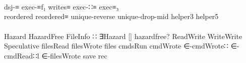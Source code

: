 \begin{code}[hide]
\AgdaSymbol{)}\<%
\\
\>[0]\AgdaSpace{}%
\AgdaSpace{}%
\AgdaSpace{}%
\AgdaSpace{}%
\AgdaSymbol{(}\AgdaSymbol{)}\<%
\\
\>[0]\AgdaSpace{}%
\AgdaSpace{}%
\AgdaSpace{}%
\AgdaSymbol{(}\AgdaSymbol{)}\AgdaSpace{}%
\AgdaSpace{}%
\<%
\\
\>[0]\AgdaSpace{}%
\AgdaSpace{}%
\AgdaSpace{}%
\AgdaSymbol{(}\AgdaSymbol{)}\AgdaSpace{}%
\AgdaSpace{}%
\AgdaSymbol{(}dsj-≡ \AgdaSymbol{;} exec-≡f₁ \AgdaSymbol{;} writes≡ \AgdaSymbol{;} exec-∷≡ \AgdaSymbol{;} exec≡₃\AgdaSymbol{)}\<%
\\
\>[0]\AgdaSpace{}%
\AgdaSpace{}%
\AgdaSpace{}%
\AgdaSymbol{(}\AgdaSymbol{)}\AgdaSpace{}%
\AgdaSpace{}%
\AgdaSymbol{(}reordered \AgdaSymbol{;} reordered≡ \AgdaSymbol{;} unique-reverse \AgdaSymbol{;} unique-drop-mid \AgdaSymbol{;} helper3 \AgdaSymbol{;} helper5\AgdaSymbol{)}\<%
\\
%
\\[\AgdaEmptyExtraSkip]%
\>[0]\AgdaSpace{}%
\AgdaSpace{}%
\AgdaSpace{}%
\AgdaSymbol{(}\AgdaSymbol{)}\AgdaSpace{}%
\AgdaSpace{}%
\AgdaSymbol{(}Hazard \AgdaSymbol{;} HazardFree \AgdaSymbol{;} FileInfo \AgdaSymbol{;} \AgdaUnderscore{}∷\AgdaUnderscore{} \AgdaSymbol{;} ∃Hazard \AgdaSymbol{;} [] \AgdaSymbol{;} hazardfree? \AgdaSymbol{;} ReadWrite \AgdaSymbol{;} WriteWrite \AgdaSymbol{;} Speculative \AgdaSymbol{;} filesRead \AgdaSymbol{;} filesWrote \AgdaSymbol{;} files \AgdaSymbol{;} cmdsRun \AgdaSymbol{;} cmdWrote \AgdaSymbol{;} ∈-cmdWrote∷ \AgdaSymbol{;} ∈-cmdRead∷l \AgdaSymbol{;} ∈-filesWrote\AgdaSymbol{)}\AgdaSpace{}%
\AgdaSpace{}%
\AgdaSymbol{(}save  rec\AgdaSymbol{)}\<%
\\
%
\\[\AgdaEmptyExtraSkip]%
\>[0]\AgdaSpace{}%
\AgdaSpace{}%
\AgdaSpace{}%
\AgdaSymbol{(}\AgdaSymbol{)}\AgdaSpace{}%

\end{code}
